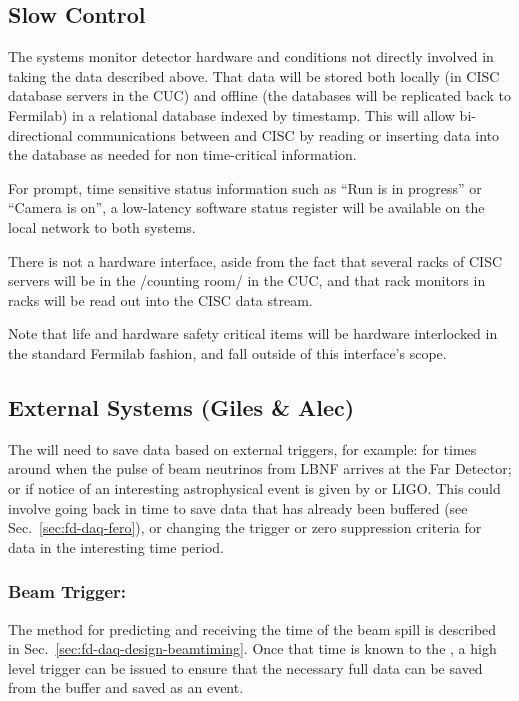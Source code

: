 \subsection{Slow Control}
\label{sec:fd-daq-intfc-sc}
\label{sec:fd-daq-intfc-sc}

The  systems monitor detector hardware and conditions not
directly involved in taking the data described above.
That data will be stored both locally (in CISC database servers in the
CUC) and offline (the databases will be replicated back to Fermilab)
in a relational database indexed by timestamp.
This will allow bi-directional communications between  and CISC by
reading or inserting data into the database as needed for non
time-critical information.  

For prompt, time sensitive status information such as ``Run is in
progress'' or ``Camera is on'', a low-latency software status register
will be available on the local network to both systems.

There is not a hardware interface, aside from the fact that several
racks of CISC servers will be in the /counting room/ in the CUC, and that rack
monitors in  racks will be read out into the CISC data stream.

Note that life and hardware safety critical items will be hardware
interlocked in the standard Fermilab fashion, and fall outside of this
interface's scope.


\subsection{External Systems (Giles \& Alec)}
\label{sec:fd-daq-intfc-ext}


The  will need to save data based on external triggers, for
example: for times around when the pulse of beam neutrinos from LBNF
arrives at the Far Detector; or if notice of an interesting
astrophysical event is given by \cite{snews} or LIGO.
This could involve going back in time to save data that has already
been buffered (see Sec.~\ref{sec:fd-daq-fero}), or changing the trigger
or zero suppression criteria for data in the interesting time period.

\subsubsection{Beam Trigger:} The method for predicting and receiving the
time of the beam spill is described in
Sec.~\ref{sec:fd-daq-design-beamtiming}.
Once that time is known to the , a high level trigger can be issued
to ensure that the necessary full data can be saved from the buffer
and saved as an event.


